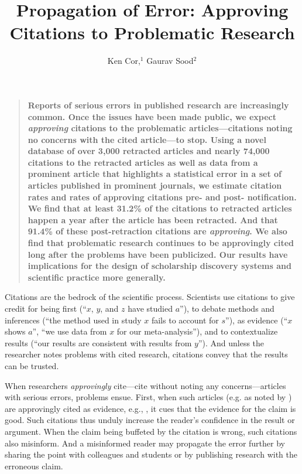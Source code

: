 \documentclass[12pt]{article}
\newenvironment{sciabstract}{%
\begin{quote} \bf}
{\end{quote}}
\begin{document}
\title{Propagation of Error: Approving Citations to Problematic Research} 

\author
{Ken Cor,$^{1}$ Gaurav Sood$^{2}$}

\date{}


\baselineskip24pt


\maketitle 

\begin{sciabstract}
Reports of serious errors in published research are increasingly common. Once the issues have been made public, we expect \textit{approving} citations to the problematic articles---citations noting no concerns with the cited article---to stop. Using a novel database of over 3,000 retracted articles and nearly 74,000 citations to the retracted articles as well as data from a prominent article that highlights a statistical error in a set of articles published in prominent journals, we estimate citation rates and rates of approving citations pre- and post- notification. We find that at least 31.2\% of the citations to retracted articles happen a year after the article has been retracted. And that 91.4\% of these post-retraction citations are \textit{approving}. We also find that problematic research continues to be approvingly cited long after the problems have been publicized. Our results have implications for the design of scholarship discovery systems and scientific practice more generally.
\end{sciabstract}

\clearpage

Citations are the bedrock of the scientific process. Scientists use citations to give credit for being first (``$x$, $y$, and $z$ have studied $a$''), to debate methods and inferences (``the method used in study $x$ fails to account for $s$''), as evidence (``$x$ shows $a$'', ``we use data from $x$ for our meta-analysis''), and to contextualize results (``our results are consistent with results from $y$''). And unless the researcher notes problems with cited research, citations convey that the results can be trusted.

When researchers \textit{approvingly} cite---cite without noting any concerns---articles with serious errors, problems ensue. First, when such articles (e.g. \cite{rubio2005spontaneous} as noted by \cite{torsvik2010spontaneous}) are approvingly cited as evidence, e.g., \cite{chang2013safety}, it cues that the evidence for the claim is good. Such citations thus unduly increase the reader's confidence in the result or argument. When the claim being buffeted by the citation is wrong, such citations also misinform. And a misinformed reader may propagate the error further by sharing the point with colleagues and students or by publishing research with the erroneous claim.
\end{document}
